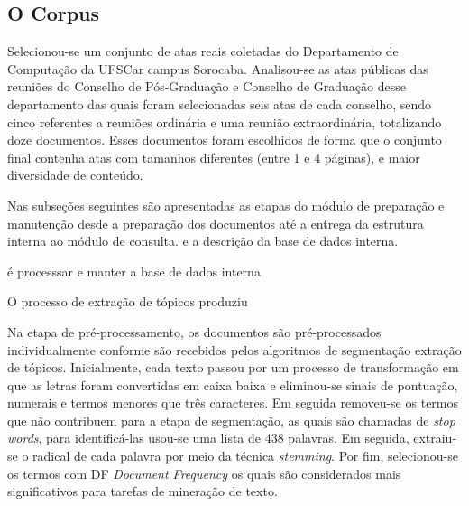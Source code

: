 \subsection{O Corpus}


Selecionou-se um conjunto de atas reais coletadas do Departamento de Computação da UFSCar campus Sorocaba. Analisou-se as atas públicas das reuniões do Conselho de Pós-Graduação e Conselho de Graduação desse departamento das quais foram selecionadas seis atas de cada conselho, sendo cinco referentes a reuniões ordinária e uma reunião extraordinária, totalizando doze documentos. Esses documentos foram escolhidos de forma que o conjunto final contenha atas com tamanhos diferentes (entre 1 e 4 páginas), e maior diversidade de conteúdo.






Nas subseções seguintes são apresentadas as etapas do módulo de preparação e manutenção desde a preparação dos documentos até a entrega da estrutura interna ao módulo de consulta. 
e a descrição da base de dados interna.







 é processsar e manter a base de dados interna











O processo de extração de tópicos produziu 












Na etapa de pré-processamento, os documentos são pré-processados individualmente conforme são recebidos pelos algoritmos de segmentação extração de tópicos. 
Inicialmente, cada texto passou por um processo de transformação em que as letras foram convertidas em caixa baixa e eliminou-se sinais de pontuação, numerais e termos menores que três caracteres. Em seguida removeu-se os termos que não contribuem para a etapa de segmentação, as quais são chamadas de \textit{stop words}, para identificá-las usou-se uma lista de 438 palavras. Em seguida, extraiu-se o radical de cada palavra por meio da técnica \textit{stemming}. Por fim, selecionou-se os termos com DF \textit{Document Frequency}  os quais são considerados mais significativos para tarefas de mineração de texto.




